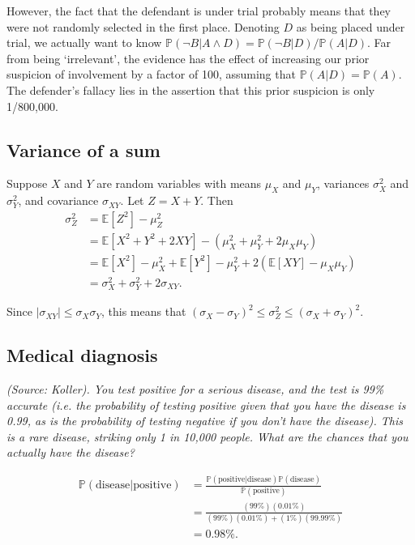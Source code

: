 However, the fact that the defendant is under trial probably means that they were not randomly selected in the first place. Denoting $D$ as being placed under trial, we actually want to know $\mathbb{P}(\neg B|A \land D) = \mathbb{P}(\neg B|D)/\mathbb{P}(A|D)$. Far from being `irrelevant', the evidence has the effect of increasing our prior suspicion of involvement by a factor of 100, assuming that $\mathbb{P}(A|D) = \mathbb{P}(A)$. The defender's fallacy lies in the assertion that this prior suspicion is only 1/800,000.

\subsection{Variance of a sum}
Suppose $X$ and $Y$ are random variables with means $\mu_X$ and $\mu_Y$, variances $\sigma_X^2$ and $\sigma_Y^2$, and covariance $\sigma_{XY}$. Let $Z = X + Y$. Then
\begin{align*}
\sigma_Z^2 &= \mathbb{E}[Z^2] - \mu_Z^2\\
&= \mathbb{E}[X^2 + Y^2 + 2XY] - (\mu_X^2 + \mu_Y^2 + 2\mu_X\mu_Y)\\
&= \mathbb{E}[X^2] - \mu_X^2 + \mathbb{E}[Y^2] - \mu_Y^2 + 2(\mathbb{E}[XY] - \mu_X\mu_Y)\\
&= \sigma_X^2 + \sigma_Y^2 + 2\sigma_{XY}.
\end{align*}

Since $|\sigma_{XY}| \leq \sigma_X\sigma_Y$, this means that $(\sigma_X - \sigma_Y)^2 \leq \sigma_Z^2 \leq (\sigma_X + \sigma_Y)^2$.

\subsection{Medical diagnosis}
\textit{(Source: Koller). You test positive for a serious disease, and the test is 99\% accurate (i.e. the probability of testing positive given that you have the disease is 0.99, as is the probability of testing negative if you don't have the disease). This is a rare disease, striking only 1 in 10,000 people. What are the chances that you actually have the disease?}

\begin{align*}
\mathbb{P}(\mathrm{disease}|\mathrm{positive}) &= \frac{\mathbb{P}(\mathrm{positive}|\mathrm{disease}) \mathbb{P}(\mathrm{disease})}{\mathbb{P}(\mathrm{positive})}\\
&= \frac{(99\%)(0.01\%)}{(99\%)(0.01\%)+(1\%)(99.99\%)}\\ &= 0.98\%.
\end{align*}

